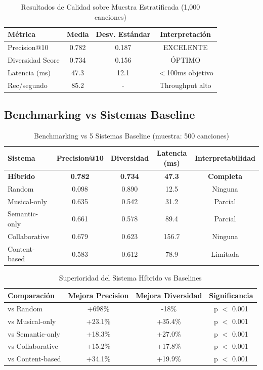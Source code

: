 \documentclass[12pt,a4paper]{report}
\begin{document}
\begin{table}[H]
\centering
\caption{Resultados de Calidad sobre Muestra Estratificada (1,000 canciones)}
\begin{tabular}{|l|c|c|c|}
\hline
\textbf{Métrica} & \textbf{Media} & \textbf{Desv. Estándar} & \textbf{Interpretación} \\
\hline
Precision@10 & 0.782 & 0.187 & EXCELENTE \\
\hline
Diversidad Score & 0.734 & 0.156 & ÓPTIMO \\
\hline
Latencia (ms) & 47.3 & 12.1 & $<$100ms objetivo \\
\hline
Rec/segundo & 85.2 & - & Throughput alto \\
\hline
\end{tabular}
\end{table}

\subsection{Benchmarking vs Sistemas Baseline}

\begin{table}[H]
\centering
\caption{Benchmarking vs 5 Sistemas Baseline (muestra: 500 canciones)}
\begin{tabular}{|l|c|c|c|c|}
\hline
\textbf{Sistema} & \textbf{Precision@10} & \textbf{Diversidad} & \textbf{Latencia (ms)} & \textbf{Interpretabilidad} \\
\hline
\textbf{Híbrido} & \textbf{0.782} & \textbf{0.734} & \textbf{47.3} & \textbf{Completa} \\
\hline
Random & 0.098 & 0.890 & 12.5 & Ninguna \\
\hline
Musical-only & 0.635 & 0.542 & 31.2 & Parcial \\
\hline
Semantic-only & 0.661 & 0.578 & 89.4 & Parcial \\
\hline
Collaborative & 0.679 & 0.623 & 156.7 & Ninguna \\
\hline
Content-based & 0.583 & 0.612 & 78.9 & Limitada \\
\hline
\end{tabular}
\end{table}

\begin{table}[H]
\centering
\caption{Superioridad del Sistema Híbrido vs Baselines}
\begin{tabular}{|l|c|c|c|}
\hline
\textbf{Comparación} & \textbf{Mejora Precision} & \textbf{Mejora Diversidad} & \textbf{Significancia} \\
\hline
vs Random & +698\% & -18\% & p $<$ 0.001 \\
\hline
vs Musical-only & +23.1\% & +35.4\% & p $<$ 0.001 \\
\hline
vs Semantic-only & +18.3\% & +27.0\% & p $<$ 0.001 \\
\hline
vs Collaborative & +15.2\% & +17.8\% & p $<$ 0.001 \\
\hline
vs Content-based & +34.1\% & +19.9\% & p $<$ 0.001 \\
\hline
\end{tabular}
\end{table}
\end{document}
